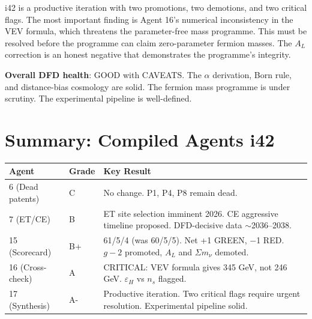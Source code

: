 \documentclass[11pt,a4paper]{article}
\begin{document}
i42 is a productive iteration with two promotions, two demotions, and two critical flags. The most important finding is Agent 16's numerical inconsistency in the VEV formula, which threatens the parameter-free mass programme. This must be resolved before the programme can claim zero-parameter fermion masses. The $A_L$ correction is an honest negative that demonstrates the programme's integrity.

\textbf{Overall DFD health}: GOOD with CAVEATS. The $\alpha$ derivation, Born rule, and distance-bias cosmology are solid. The fermion mass programme is under scrutiny. The experimental pipeline is well-defined.


\section*{Summary: Compiled Agents i42}

\begin{center}
\begin{tabular}{llp{8cm}}
\toprule
\textbf{Agent} & \textbf{Grade} & \textbf{Key Result} \\
\midrule
6 (Dead patents) & C & No change. P1, P4, P8 remain dead. \\
7 (ET/CE) & B & ET site selection imminent 2026. CE aggressive timeline proposed. DFD-decisive data $\sim$2036--2038. \\
15 (Scorecard) & B+ & 61/5/4 (was 60/5/5). Net +1 GREEN, $-$1 RED. $g-2$ promoted, $A_L$ and $\Sigma m_\nu$ demoted. \\
16 (Cross-check) & A & CRITICAL: VEV formula gives 345 GeV, not 246 GeV. $\varepsilon_H$ vs $n_s$ flagged. \\
17 (Synthesis) & A- & Productive iteration. Two critical flags require urgent resolution. Experimental pipeline solid. \\
\bottomrule
\end{tabular}
\end{center}
\end{document}
